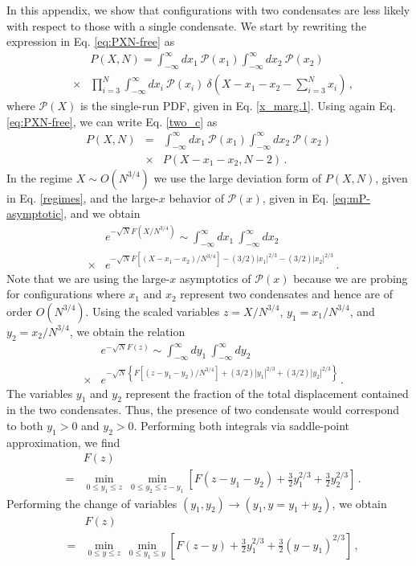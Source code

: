 \documentclass[aps,pre,twocolumn,superscriptaddress,showpacs]{revtex4-1}
\newcommand{\bea}{\begin{eqnarray}}
\newcommand{\eea}{\end{eqnarray}}
\newcommand{\mP}{\mathcal{P}}
\begin{document}
In this appendix, we show that configurations with two condensates are less likely with respect to those with a single condensate. We start by rewriting the expression in Eq. \eqref{eq:PXN-free} as
\bea
&&P(X,N) =  \int_{-\infty}^{\infty}
dx_1~\mP(x_1)\int_{-\infty}^{\infty}
dx_2~\mP(x_2)\\
&\times&  \prod_{i=3}^N \int_{-\infty}^{\infty}
dx_i~\mP(x_i)~\delta\left(X-x_1-x_2-\sum_{i=3}^N x_i\right)\,,
\label{two_c}
\nonumber
\eea
where $\mP(X)$ is the single-run PDF, given in Eq. \eqref{x_marg.1}. Using again Eq. \eqref{eq:PXN-free}, we can write Eq. \eqref{two_c} as
\bea
P(X,N) &=&  \int_{-\infty}^{\infty}
dx_1~\mP(x_1)\int_{-\infty}^{\infty}
dx_2~\mP(x_2)\nonumber\\
&\times & P(X-x_1-x_2,N-2)\,.
\eea
In the regime $X\sim O(N^{3/4})$ we use the large deviation form of $P(X,N)$, given in Eq. \eqref{regimes}, and the large-$x$ behavior of $\mP(x)$, given in Eq. \eqref{eq:mP-asymptotic}, and we obtain
\begin{eqnarray}
&& e^{-\sqrt{N}F(X/N^{3/4})}\sim \int_{-\infty}^{\infty}dx_1~\int_{-\infty}^{\infty}dx_2~\\
&\times & e^{-\sqrt{N}F[(X-x_1-x_2)/N^{3/4}]-(3/2)|x_1|^{2/3}-(3/2)|x_2|^{2/3}}\,.\nonumber
\end{eqnarray}
Note that we are using the large-$x$ asymptotics of $\mP(x)$ because we are probing for configurations where $x_1$ and $x_2$ represent two condensates and hence are of order $O(N^{3/4})$.
Using the scaled variables $z=X/N^{3/4}$, $y_1=x_1/N^{3/4}$, and $y_2=x_2/N^{3/4}$, we obtain the relation
\begin{eqnarray}
&& e^{-\sqrt{N}F(z)}\sim \int_{-\infty}^{\infty}dy_1~\int_{-\infty}^{\infty}dy_2~\\
&\times & e^{-\sqrt{N}\left\{F[(z-y_1-y_2)/N^{3/4}]+(3/2)|y_1|^{2/3}+(3/2)|y_2|^{2/3}\right\}}\,.\nonumber
\end{eqnarray}
The variables $y_1$ and $y_2$ represent the fraction of the total displacement contained in the two condensates. Thus, the presence of two condensate would correspond to both $y_1>0$ and $y_2>0$. Performing both integrals via saddle-point approximation, we find
\begin{eqnarray}
&&F(z)\\
&=&\min_{0\leq y_1\leq z}~\min_{0\leq y_2\leq z-y_1}
\left[F(z-y_1-y_2)+\frac32 y_1^{2/3}+\frac32 y_2^{2/3}\right]\,.\nonumber
\end{eqnarray}
Performing the change of variables $(y_1,y_2)\to (y_1,y=y_1+y_2)$, we obtain
\begin{eqnarray}
&&F(z)\\
&=&\min_{0\leq y\leq z}~\min_{0\leq y_1\leq y}
\left[F(z-y)+\frac32 y_1^{2/3}+\frac32 (y-y_1)^{2/3}\right]\,,\nonumber
\end{eqnarray}
\end{document}
